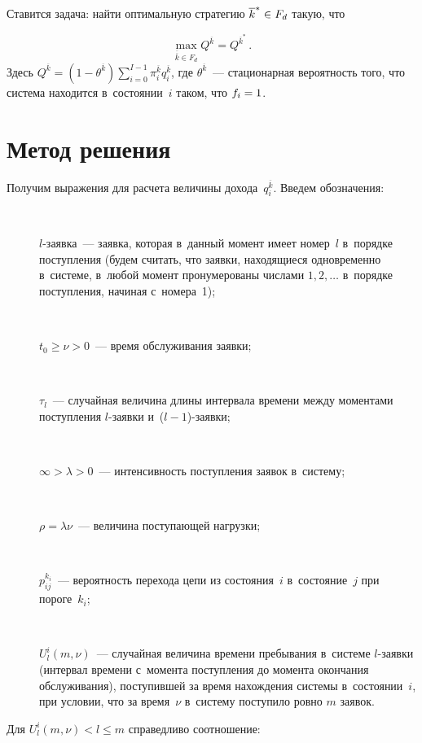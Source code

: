 \begin{multicols}{2}
  Ставится задача: найти оптимальную стратегию $\overline{k}^*\hm\in F_d$
такую, что

\noindent
  \begin{equation}
  \max\limits_{\overline{\overline{k}}\in F_d} Q^{\overline{k}}
=Q^{\overline{k}^*}\,.
  \label{e2-aga}
  \end{equation}
Здесь $Q^{\overline{k}} = (1-\theta^{\overline{k}}) \sum\limits_{i=0}^{I-1}
\pi_i^{\overline{k}} q_i^{\overline{k}}$, где $\theta^{\overline{k}}$~---
стационарная вероятность того, что система находится в~состоянии~$i$ таком,
что $f_i\hm=1$.

\vspace*{-3pt}

\section{Метод решения}

  Получим выражения для расчета величины дохода~$q_i^{\overline{k}}$.
Введем обозначения:
\begin{description}
\item[\,]     $l$-заявка~--- заявка, которая в~данный момент имеет номер~$l$ 
     в~порядке поступления (будем считать, что заявки, находящиеся одновременно 
     в~сис\-те\-ме, в~любой момент пронумерованы числами $1, 2,\ldots$ в~порядке
поступления, начиная с~номера~1);
\item[\,]
     $t_0\geq \nu>0$~--- время обслуживания заявки;
\item[\,]
     $\tau_l$~--- случайная величина длины интервала времени между
моментами поступления $l$-заявки и~($l-1$)-за\-явки;
\item[\,]
     $\infty >\lambda >0$~--- интенсивность поступления заявок в~систему;
\item[\,]
     $\rho=\lambda\nu$~--- величина поступающей нагрузки;
\item[\,]
     $p_{ij}^{k_i}$~--- вероятность перехода цепи из состояния~$i$ в~состояние~$j$ при пороге~$k_i$;
\item[\,]
     $U_l^i(m,\nu)$~--- случайная величина времени пребывания в~системе
$l$-за\-яв\-ки (интервал времени с~момента поступления до момента окончания
обслуживания), поступившей за время на\-хож\-де\-ния сис\-те\-мы в~состоянии~$i$,
при условии, что за время~$\nu$ в~систему поступило ровно $m$ заявок.
\end{description}

  Для $U_l^i (m,\nu)<l\leq m$ справедливо соотношение:
  

\end{multicols}
